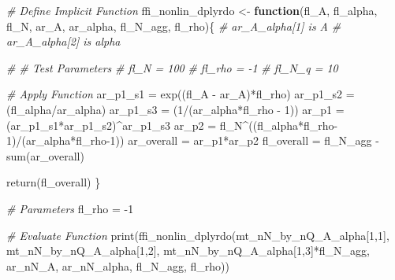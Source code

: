\documentclass[
]{book}
\newenvironment{Shaded}{\begin{snugshade}}{\end{snugshade}}
\newcommand{\CommentTok}[1]{\textcolor[rgb]{0.56,0.35,0.01}{\textit{#1}}}
\newcommand{\ControlFlowTok}[1]{\textcolor[rgb]{0.13,0.29,0.53}{\textbf{#1}}}
\newcommand{\DecValTok}[1]{\textcolor[rgb]{0.00,0.00,0.81}{#1}}
\newcommand{\FunctionTok}[1]{\textcolor[rgb]{0.00,0.00,0.00}{#1}}
\newcommand{\NormalTok}[1]{#1}
\newcommand{\OtherTok}[1]{\textcolor[rgb]{0.56,0.35,0.01}{#1}}
\newcommand{\SpecialCharTok}[1]{\textcolor[rgb]{0.00,0.00,0.00}{#1}}
\begin{document}
\begin{Shaded}
\begin{Highlighting}[]
\CommentTok{\# Define Implicit Function}
\NormalTok{ffi\_nonlin\_dplyrdo }\OtherTok{\textless{}{-}} \ControlFlowTok{function}\NormalTok{(fl\_A, fl\_alpha, fl\_N, ar\_A, ar\_alpha, fl\_N\_agg, fl\_rho)\{}
  \CommentTok{\# ar\_A\_alpha[1] is A}
  \CommentTok{\# ar\_A\_alpha[2] is alpha}

  \CommentTok{\# \# Test Parameters}
  \CommentTok{\# fl\_N = 100}
  \CommentTok{\# fl\_rho = {-}1}
  \CommentTok{\# fl\_N\_q = 10}

  \CommentTok{\# Apply Function}
\NormalTok{  ar\_p1\_s1 }\OtherTok{=} \FunctionTok{exp}\NormalTok{((fl\_A }\SpecialCharTok{{-}}\NormalTok{ ar\_A)}\SpecialCharTok{*}\NormalTok{fl\_rho)}
\NormalTok{  ar\_p1\_s2 }\OtherTok{=}\NormalTok{ (fl\_alpha}\SpecialCharTok{/}\NormalTok{ar\_alpha)}
\NormalTok{  ar\_p1\_s3 }\OtherTok{=}\NormalTok{ (}\DecValTok{1}\SpecialCharTok{/}\NormalTok{(ar\_alpha}\SpecialCharTok{*}\NormalTok{fl\_rho }\SpecialCharTok{{-}} \DecValTok{1}\NormalTok{))}
\NormalTok{  ar\_p1 }\OtherTok{=}\NormalTok{ (ar\_p1\_s1}\SpecialCharTok{*}\NormalTok{ar\_p1\_s2)}\SpecialCharTok{\^{}}\NormalTok{ar\_p1\_s3}
\NormalTok{  ar\_p2 }\OtherTok{=}\NormalTok{ fl\_N}\SpecialCharTok{\^{}}\NormalTok{((fl\_alpha}\SpecialCharTok{*}\NormalTok{fl\_rho}\DecValTok{{-}1}\NormalTok{)}\SpecialCharTok{/}\NormalTok{(ar\_alpha}\SpecialCharTok{*}\NormalTok{fl\_rho}\DecValTok{{-}1}\NormalTok{))}
\NormalTok{  ar\_overall }\OtherTok{=}\NormalTok{ ar\_p1}\SpecialCharTok{*}\NormalTok{ar\_p2}
\NormalTok{  fl\_overall }\OtherTok{=}\NormalTok{ fl\_N\_agg }\SpecialCharTok{{-}} \FunctionTok{sum}\NormalTok{(ar\_overall)}

  \FunctionTok{return}\NormalTok{(fl\_overall)}
\NormalTok{\}}

\CommentTok{\# Parameters}
\NormalTok{fl\_rho }\OtherTok{=} \SpecialCharTok{{-}}\DecValTok{1}

\CommentTok{\# Evaluate Function}
\FunctionTok{print}\NormalTok{(}\FunctionTok{ffi\_nonlin\_dplyrdo}\NormalTok{(mt\_nN\_by\_nQ\_A\_alpha[}\DecValTok{1}\NormalTok{,}\DecValTok{1}\NormalTok{],}
\NormalTok{                         mt\_nN\_by\_nQ\_A\_alpha[}\DecValTok{1}\NormalTok{,}\DecValTok{2}\NormalTok{],}
\NormalTok{                         mt\_nN\_by\_nQ\_A\_alpha[}\DecValTok{1}\NormalTok{,}\DecValTok{3}\NormalTok{]}\SpecialCharTok{*}\NormalTok{fl\_N\_agg,}
\NormalTok{                         ar\_nN\_A, ar\_nN\_alpha, fl\_N\_agg, fl\_rho))}
\end{Highlighting}
\end{Shaded}
\end{document}
